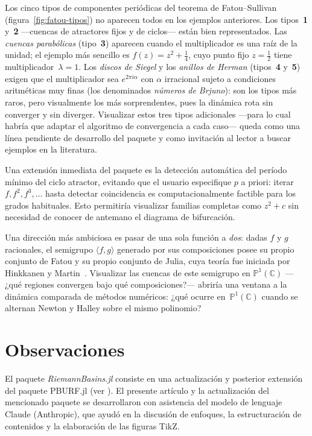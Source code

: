 \documentclass[11pt,a4paper]{article}
\theoremstyle{plain}
\theoremstyle{definition}
\theoremstyle{remark}
\newcommand{\Puno}{\mathbb{P}^1(\mathbb{C})}
\newcommand{\pkg}[1]{\textsl{#1}}
\begin{document}
Los cinco tipos de componentes periódicas del teorema de
Fatou--Sullivan (figura~\ref{fig:fatou-tipos}) no aparecen todos en
los ejemplos anteriores.
Los tipos~\textbf{1} y~\textbf{2} —cuencas de atractores fijos y de ciclos— están
bien representados.
Las \emph{cuencas parabólicas} (tipo~\textbf{3}) aparecen cuando el
multiplicador es una raíz de la unidad; el ejemplo más sencillo es
$f(z)=z^2+\tfrac{1}{4}$, cuyo punto fijo $z=\tfrac{1}{2}$ tiene
multiplicador~$\lambda=1$.
Los \emph{discos de Siegel} y los \emph{anillos de Herman}
(tipos~\textbf{4} y~\textbf{5}) exigen que el multiplicador sea $e^{2\pi i\alpha}$ con
$\alpha$ irracional sujeto a condiciones aritméticas muy finas
(los denominados \emph{números de Brjuno}): son los tipos más raros,
pero visualmente los más sorprendentes, pues la dinámica rota sin
converger y sin diverger.
Visualizar estos tres tipos adicionales —para lo cual habría que
adaptar el algoritmo de convergencia a cada caso— queda como una
línea pendiente de desarrollo  del paquete y como invitación al lector
a buscar ejemplos en la literatura.

Una extensión inmediata del paquete es la detección automática del
período mínimo del ciclo atractor, evitando que el usuario especifique
$p$ a priori: iterar $f, f^2, f^3,\ldots$ hasta detectar coincidencia
es computacionalmente factible para los grados habituales.
Esto permitiría visualizar familias completas como $z^2+c$ sin
necesidad de conocer de antemano el diagrama de bifurcación.

Una dirección más ambiciosa es pasar de una sola función a
\emph{dos}: dadas $f$ y $g$ racionales, el semigrupo
$\langle f,g\rangle$ generado por sus composiciones posee su propio
conjunto de Fatou y su propio conjunto de Julia, cuya teoría fue
iniciada por Hinkkanen y Martin~\cite{HinkkanenMartin1996}.
Visualizar las cuencas de este semigrupo en $\Puno$ —¿qué regiones
convergen bajo qué composiciones?— abriría una ventana a la dinámica
comparada de métodos numéricos: ¿qué ocurre en~$\Puno$
cuando se alternan Newton y Halley sobre el mismo polinomio?

\section*{Observaciones}


El paquete \pkg{RiemannBasins.jl} consiste en una actualización y posterior extensión del paquete 
PBURF.jl (ver \cite{PBURF2019}).
El presente artículo y la actualización del mencionado paquete   se
desarrollaron con asistencia del modelo de lenguaje Claude
(Anthropic), que ayudó en la discusión de enfoques,
la estructuración de contenidos y la elaboración de las figuras
TikZ.
\end{document}
